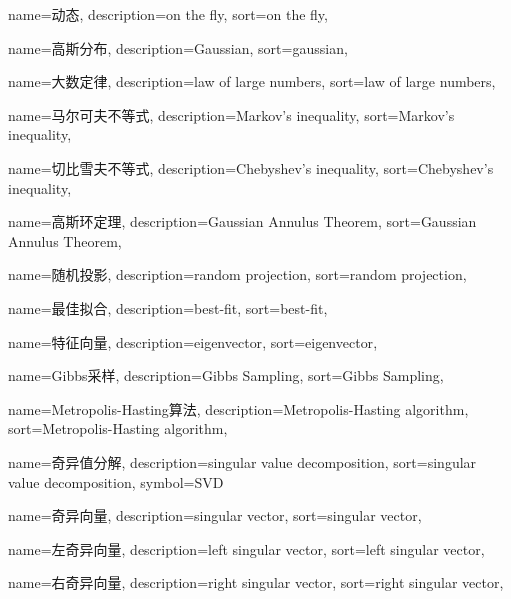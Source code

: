 {
	name=动态,%
	description={on the fly},
	sort={on the fly},
}

{
	name=高斯分布,
	description={Gaussian},
	sort={gaussian},
}

{
	name=大数定律,
	description={law of large numbers},
	sort={law of large numbers},
}

{
	name=马尔可夫不等式,
	description={Markov's inequality},
	sort={Markov's inequality},
}

{
	name=切比雪夫不等式,
	description={Chebyshev's inequality},
	sort={Chebyshev's inequality},
}

{
	name=高斯环定理,
	description={Gaussian Annulus Theorem},
	sort={Gaussian Annulus Theorem},
}

{
	name=随机投影,
	description={random projection},
	sort={random projection},
}


{
	name=最佳拟合,
	description={best-fit},
	sort={best-fit},
}

{
	name=特征向量,
	description={eigenvector},
	sort={eigenvector},
}

{
	name=Gibbs采样,
	description={Gibbs Sampling},
	sort={Gibbs Sampling},
}

{
	name=Metropolis-Hasting算法,
	description={Metropolis-Hasting algorithm},
	sort={Metropolis-Hasting algorithm},
}

{
	name=奇异值分解,
	description={singular value decomposition},
	sort={singular value decomposition},
	symbol={SVD}
}

{
	name=奇异向量,
	description={singular vector},
	sort={singular vector},
}

{
	name=左奇异向量,
	description={left singular vector},
	sort={left singular vector},
}

{
	name=右奇异向量,
	description={right singular vector},
	sort={right singular vector},
}


